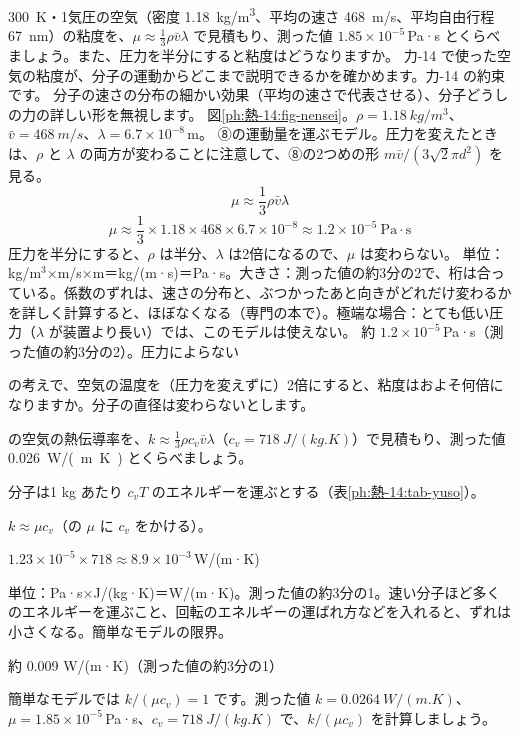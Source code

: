 \begin{phreidai}
\label{ph:熱-14:ex8}\qty{300}{K}・1気圧の空気（密度 \qty{1.18}{kg/m^3}、平均の速さ \qty{468}{m/s}、平均自由行程 \qty{67}{nm}）の粘度を、$\mu\approx\tfrac13\rho\bar v\lambda$ で見積もり、測った値 $1.85\times10^{-5}$\,Pa·s とくらべましょう。また、圧力を半分にすると粘度はどうなりますか。
\phbamen
力-14 で使った空気の粘度が、分子の運動からどこまで説明できるかを確かめます。力-14 の約束です。
\phmushi
分子の速さの分布の細かい効果（平均の速さで代表させる）、分子どうしの力の詳しい形を無視します。
\phzu
図\ref{ph:熱-14:fig-nensei}。$\rho=\qty{1.18}{kg/m^3}$、$\bar v=\qty{468}{m/s}$、$\lambda=6.7\times10^{-8}$\,m。
\phriyu
⑧の運動量を運ぶモデル。圧力を変えたときは、$\rho$ と $\lambda$ の両方が変わることに注意して、⑧の2つめの形 $m\bar v/(3\sqrt2\pi d^2)$ を見る。
\phtateru
\[ \mu\approx\frac{1}{3}\rho\bar v\lambda \]
\phtoku
\[ \mu\approx\frac{1}{3}\times1.18\times468\times6.7\times10^{-8}\approx1.2\times10^{-5}\ \mathrm{Pa\cdot s} \]
圧力を半分にすると、$\rho$ は半分、$\lambda$ は2倍になるので、$\mu$ は変わらない。
\phtashikame
単位：kg/m$^3$×m/s×m＝kg/(m·s)＝Pa·s。大きさ：測った値の約3分の2で、桁は合っている。係数のずれは、速さの分布と、ぶつかったあと向きがどれだけ変わるかを詳しく計算すると、ほぼなくなる（専門の本で）。極端な場合：とても低い圧力（$\lambda$ が装置より長い）では、このモデルは使えない。
\kotae 約 $1.2\times10^{-5}$\,Pa·s（測った値の約3分の2）。圧力によらない
\end{phreidai}
\begin{jibun}
の考えで、空気の温度を（圧力を変えずに）2倍にすると、粘度はおよそ何倍になりますか。分子の直径は変わらないとします。
\end{jibun}

\begin{reidai}[空気の熱伝導率を見積もる]
\label{ph:熱-14:ex9}の空気の熱伝導率を、$k\approx\tfrac13\rho c_v\bar v\lambda$（$c_v=\qty{718}{J/(kg.K)}$）で見積もり、測った値 \qty{0.026}{W/(m.K)} とくらべましょう。
\par{} 分子は1 kg あたり $c_vT$ のエネルギーを運ぶとする（表\ref{ph:熱-14:tab-yuso}）。
\par\kangaekata $k\approx\mu c_v$（の $\mu$ に $c_v$ をかける）。
\par\shiki $1.23\times10^{-5}\times718\approx8.9\times10^{-3}$\,W/(m·K)
\par{} 単位：Pa·s×J/(kg·K)＝W/(m·K)。測った値の約3分の1。速い分子ほど多くのエネルギーを運ぶこと、回転のエネルギーの運ばれ方などを入れると、ずれは小さくなる。簡単なモデルの限界。
\par\kotae 約 0.009 W/(m·K)（測った値の約3分の1）
\end{reidai}
\begin{jibun}
簡単なモデルでは $k/(\mu c_v)=1$ です。測った値 $k=\qty{0.0264}{W/(m.K)}$、$\mu=1.85\times10^{-5}$\,Pa·s、$c_v=\qty{718}{J/(kg.K)}$ で、$k/(\mu c_v)$ を計算しましょう。
\end{jibun}

